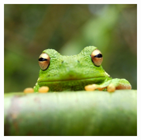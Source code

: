\documentclass[9pt]{livecoms}
\begin{document}
\begin{appendixbox}
\includegraphics[width=\linewidth,height=7cm]{frog}
\end{appendixbox}
\end{document}
